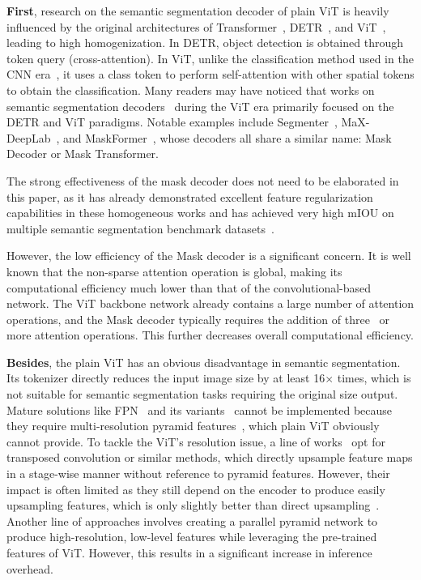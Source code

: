 \textbf{First}, research on the semantic segmentation decoder of plain ViT is heavily influenced by the original architectures of Transformer~\cite{cAttentionIsAllYourNeed}, DETR~\cite{cDETR}, and ViT~\cite{cViT}, leading to high homogenization.
%
In DETR, object detection is obtained through token query (cross-attention). 
%
In ViT, unlike the classification method used in the CNN era~\cite{cResnet}, it uses a class token to perform self-attention with other spatial tokens to obtain the classification.
%
Many readers may have noticed that works on semantic segmentation decoders~\cite{cSegmenter,cMaXDeepLab,cKMaXDeepLab,cMaskFormer,cMask2Former,cSegViT} during the ViT era primarily focused on the DETR and ViT paradigms. 
%
Notable examples include Segmenter~\cite{cSegmenter}, MaX-DeepLab~\cite{cMaXDeepLab}, and MaskFormer~\cite{cMaskFormer}, whose decoders all share a similar name: Mask Decoder or Mask Transformer.
%

The strong effectiveness of the mask decoder does not need to be elaborated in this paper, as it has already demonstrated excellent feature regularization capabilities in these homogeneous works and has achieved very high mIOU on multiple semantic segmentation benchmark datasets~\cite{cPascalContext,cCocoStuff,cCityScapes}.

However, the low efficiency of the Mask decoder is a significant concern. 
%
It is well known that the non-sparse attention operation is global, making its computational efficiency much lower than that of the convolutional-based network. 
%
The ViT backbone network already contains a large number of attention operations, and the Mask decoder typically requires the addition of three~\cite{cSegmenter,cSegViT} or more attention operations. 
%
This further decreases overall computational efficiency.



\textbf{Besides}, the plain ViT has an obvious disadvantage in semantic segmentation.
Its tokenizer directly reduces the input image size by at least 16$\times$ times, which is not suitable for semantic segmentation tasks requiring the original size output.
%
Mature solutions like FPN~\cite{cFPN} and its variants~\cite{cFaPN,cFastFCN,cDeepLabV3Plus,cUper} cannot be implemented because they require multi-resolution pyramid features~\cite{cVGG,cResnet,cXception,cEfficientNet}, which plain ViT obviously cannot provide.
%
To tackle the ViT's resolution issue, a line of works~\cite{cSETR} opt for transposed convolution or similar methods, which directly upsample feature maps in a stage-wise manner without reference to pyramid features.
%
However, their impact is often limited as they still depend on the encoder to produce easily upsampling features, which is only slightly better than direct upsampling~\cite{cSegmenter}.
%
Another line of approaches involves creating a parallel pyramid network to produce high-resolution, low-level features while leveraging the pre-trained features of ViT. 
%
However, this results in a significant increase in inference overhead.


